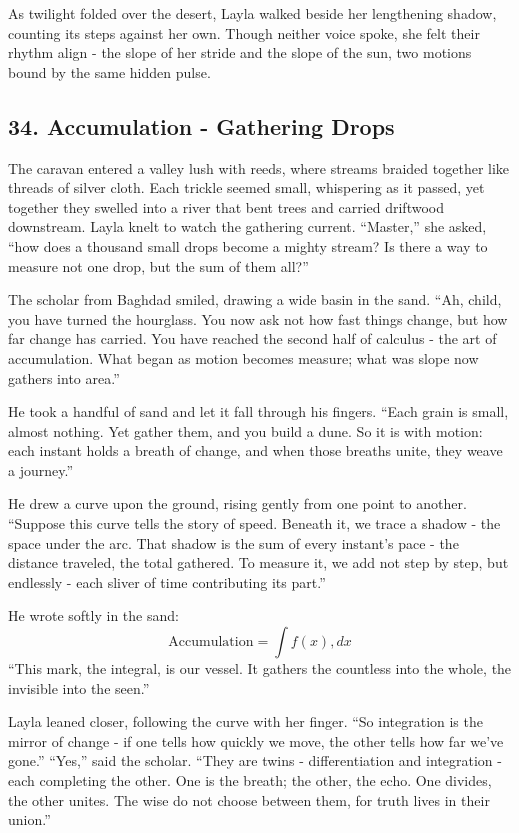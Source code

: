 \documentclass[
  letterpaper,
  DIV=11,
  numbers=noendperiod]{scrreprt}
\begin{document}
As twilight folded over the desert, Layla walked beside her lengthening
shadow, counting its steps against her own. Though neither voice spoke,
she felt their rhythm align - the slope of her stride and the slope of
the sun, two motions bound by the same hidden pulse.

\subsection{34. Accumulation - Gathering
Drops}\label{accumulation---gathering-drops}

The caravan entered a valley lush with reeds, where streams braided
together like threads of silver cloth. Each trickle seemed small,
whispering as it passed, yet together they swelled into a river that
bent trees and carried driftwood downstream. Layla knelt to watch the
gathering current. ``Master,'' she asked, ``how does a thousand small
drops become a mighty stream? Is there a way to measure not one drop,
but the sum of them all?''

The scholar from Baghdad smiled, drawing a wide basin in the sand. ``Ah,
child, you have turned the hourglass. You now ask not how fast things
change, but how far change has carried. You have reached the second half
of calculus - the art of accumulation. What began as motion becomes
measure; what was slope now gathers into area.''

He took a handful of sand and let it fall through his fingers. ``Each
grain is small, almost nothing. Yet gather them, and you build a dune.
So it is with motion: each instant holds a breath of change, and when
those breaths unite, they weave a journey.''

He drew a curve upon the ground, rising gently from one point to
another. ``Suppose this curve tells the story of speed. Beneath it, we
trace a shadow - the space under the arc. That shadow is the sum of
every instant's pace - the distance traveled, the total gathered. To
measure it, we add not step by step, but endlessly - each sliver of time
contributing its part.''

He wrote softly in the sand: \[
\text{Accumulation} = \int f(x),dx
\] ``This mark, the integral, is our vessel. It gathers the countless
into the whole, the invisible into the seen.''

Layla leaned closer, following the curve with her finger. ``So
integration is the mirror of change - if one tells how quickly we move,
the other tells how far we've gone.'' ``Yes,'' said the scholar. ``They
are twins - differentiation and integration - each completing the other.
One is the breath; the other, the echo. One divides, the other unites.
The wise do not choose between them, for truth lives in their union.''
\end{document}
